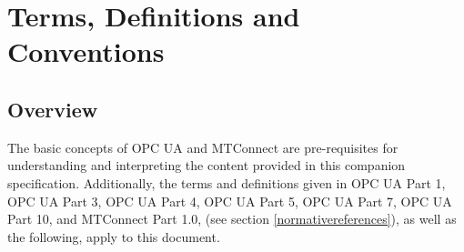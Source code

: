 \section{Terms, Definitions and Conventions}\label{termsdefinitionsconventions}

\subsection{Overview}

The basic concepts of OPC UA and MTConnect are pre-requisites for understanding and interpreting the content provided in this companion specification. Additionally, the terms and definitions given in OPC UA Part 1, OPC UA Part 3, OPC UA Part 4, OPC UA Part 5, OPC UA Part 7, OPC UA Part 10, and MTConnect Part 1.0, (see section \ref{normativereferences}), as well as the following, apply to this document. 

\iffalse
\subsection{OPC UA for MTConnect terms}

\texttt{NEEDS TO BE DISCUSSED}
The following terms (1 and 2) are examples. They have the IEC format for term definitions.

\subsubsection{term\_1}
<a short description - max two lines>

\begin{quote}
\footnotesize
Note 1 to entry: Optional additional text if the short description is not considered sufficient.
\end{quote}

\subsubsection{term\_2}
<a short description - max two lines>
....
\fi
